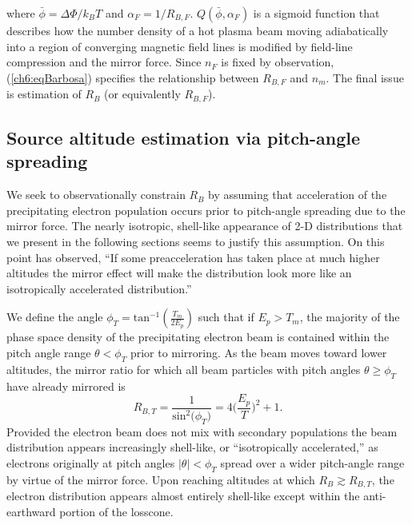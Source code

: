   where $\bar{\phi} = \Delta \Phi / k_B T $ and $\alpha_F = 1 / R_{B,F}$.
  $Q (\bar{\phi}, \alpha_F)$ is a sigmoid function \citep[Figure
  1b][]{Barbosa1977} that describes how the number density of a hot plasma beam
  moving adiabatically into a region of converging magnetic field lines is
  modified by field-line compression and the mirror force. Since $n_F$ is fixed
  by observation, (\ref{ch6:eqBarbosa}) specifies the relationship between
  $R_{B,F}$ and $n_m$. The final issue is estimation of $R_B$ (or equivalently
  $R_{B,F}$).

  \subsection{Source altitude estimation via pitch-angle spreading} \label{ssSourceAlt}

  We seek to observationally constrain $R_B$ by assuming that acceleration of
  the precipitating electron population occurs prior to pitch-angle spreading
  due to the mirror force. The nearly isotropic, shell-like appearance of 2-D
  distributions that we present in the following sections seems to justify this
  assumption. On this point \citet{Bostrom2003a} has observed, ``If some
  preacceleration has taken place at much higher altitudes the mirror effect
  will make the distribution look more like an isotropically accelerated
  distribution.''

  We define the angle $\phi_T = \textrm{tan}^{-1} ( \frac{T_m}{2 E_p} )$ such
  that if $E_p > T_m$, the majority of the phase space density of the
  precipitating electron beam is contained within the pitch angle range
  $ \theta < \phi_T$ prior to mirroring. As the beam moves toward lower
  altitudes, the mirror ratio for which all beam particles with pitch angles
  $\theta \geq \phi_T$ have already mirrored is
  \begin{equation} \label{ch6:RBTherm} R_{B,T} = \dfrac{1}{\mathrm{sin}^2 \big
      (\phi_T \big ) } = 4 \Big ( \dfrac{E_p}{T} \Big )^2 + 1.
  \end{equation}
  Provided the electron beam does not mix with secondary populations the beam
  distribution appears increasingly shell-like, or ``isotropically
  accelerated,'' as electrons originally at pitch angles
  $\vert \theta \vert < \phi_T$ spread over a wider pitch-angle range by virtue
  of the mirror force. Upon reaching altitudes at which $R_B \gtrsim R_{B,T}$,
  the electron distribution appears almost entirely shell-like except within the
  anti-earthward portion of the losscone. 


